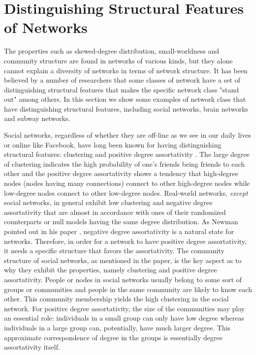 	
	
	\section{Distinguishing Structural Features of Networks}
The properties such as skewed-degree distribution, small-worldness and community structure are found in networks of various kinds, but they alone cannot explain a diversity of networks in terms of network structure. It has been believed by a number of researchers that some classes of network have a set of distinguishing structural features that makes the specific network class "stand out" among others. In this section we show some examples of network class that have distinguishing structural features, including social networks, brain networks and subway networks.

Social networks, regardless of whether they are off-line as we see in our daily lives or online like Facebook, have long been known for having  distinguishing structural features: clustering and positive degree assortativity \cite{AssortativeMixing,WhySocialNetworks, Mislove:2007:OnlineSocial}. The large degree of clustering indicates the high probability of one's friends being friends to each other and the positive degree assortativity shows a tendency that high-degree nodes (nodes having many connections) connect to other high-degree nodes while low-degree nodes connect to other low-degree nodes. Real-world networks, \textit{except} social networks, in general exhibit low clustering and negative degree assortativity that are almost in accordance with ones of their randomized counterparts or null models having the same degree distribution. As Newman pointed out in his paper \cite{WhySocialNetworks}, negative degree assortativity is a natural state for networks. Therefore, in order for a network to have positive degree assortativity, it needs a specific structure that favors the assortativity. The community structure of social networks, as mentioned in the paper, is the key aspect as to why they exhibit the properties, namely clustering and positive degree assortativity. People or nodes in social networks usually belong to some sort of groups or communities and people in the same community are likely to know each other. This community membership yields the high clustering in the social network.  For positive degree assortativity, the size of the communities may play an essential role: individuals in a small group can only have low degree whereas individuals in a large group can, potentially, have much larger degree. This approximate correspondence of degree in the groups is essentially degree assortativity itself.


